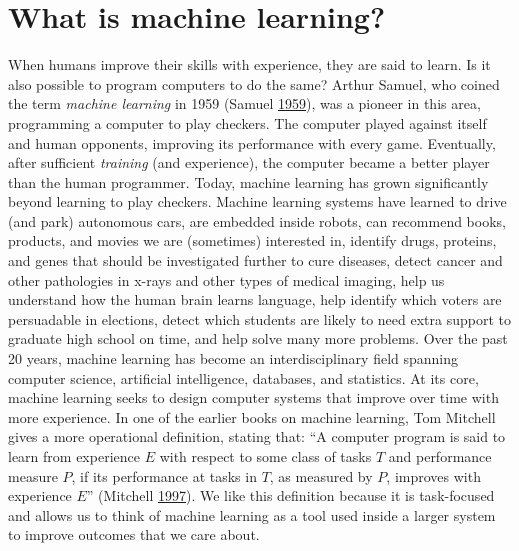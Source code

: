 \documentclass[]{krantz}
\begin{document}
\section{What is machine learning?}\label{what-is-machine-learning}

When humans improve their skills with experience, they are said to
learn. Is it also possible to program computers to do the same? Arthur
Samuel, who coined the term \emph{machine learning} in 1959 (Samuel
\protect\hyperlink{ref-samuel1959some}{1959}), was a pioneer in this
area, programming a computer to play checkers. The computer played
against itself and human opponents, improving its performance with every
game. Eventually, after sufficient \emph{training} (and experience), the
computer became a better player than the human programmer. Today,
machine learning has grown significantly beyond learning to play
checkers. Machine learning systems have learned to drive (and park)
autonomous cars, are embedded inside robots, can recommend books,
products, and movies we are (sometimes) interested in, identify drugs,
proteins, and genes that should be investigated further to cure
diseases, detect cancer and other pathologies in x-rays and other types
of medical imaging, help us understand how the human brain learns
language, help identify which voters are persuadable in elections,
detect which students are likely to need extra support to graduate high
school on time, and help solve many more problems. Over the past 20
years, machine learning has become an interdisciplinary field spanning
computer science, artificial intelligence, databases, and statistics. At
its core, machine learning seeks to design computer systems that improve
over time with more experience. In one of the earlier books on machine
learning, Tom Mitchell gives a more operational definition, stating
that: ``A computer program is said to learn from experience \(E\) with
respect to some class of tasks \(T\) and performance measure \(P\), if
its performance at tasks in \(T\), as measured by \(P\), improves with
experience \(E\)'' (Mitchell
\protect\hyperlink{ref-mitchell1997machine}{1997}). We like this
definition because it is task-focused and allows us to think of machine
learning as a tool used inside a larger system to improve outcomes that
we care about.

\enlargethispage{6pt}
\end{document}
